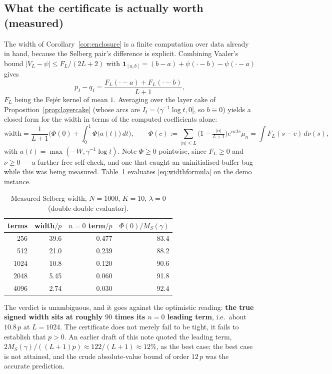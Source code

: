 \documentclass[11pt]{article}
\begin{document}
\subsection{What the certificate is actually worth (measured)}
\label{sec:worth}

The width of Corollary~\ref{cor:enclosure} is a finite computation over data already in hand,
because the Selberg pair's difference is explicit. Combining Vaaler's bound
$|V_L-\psi|\le F_L/(2L+2)$ with $\mathbf 1_{[a,b]}=(b-a)+\psi(\cdot-b)-\psi(\cdot-a)$ gives
\[
  p_I-q_I=\frac{F_L(\cdot-a)+F_L(\cdot-b)}{L+1},
\]
$F_L$ being the Fej\'er kernel of mean $1$. Averaging over the layer cake of
Proposition~\ref{prop:layercake} (whose arcs are $I_t=(\gamma^{-1}\log t,0]$, so $b\equiv0$) yields
a closed form for the width in terms of the computed coefficients alone:
\begin{equation}
  \label{eq:widthformula}
  \mathrm{width}=\frac{1}{L+1}\Big(\Phi(0)+\int_0^1\!\Phi\big(a(t)\big)\,dt\Big),
  \qquad
  \Phi(c):=\!\!\sum_{|n|\le L}\!\!\Big(1-\tfrac{|n|}{L+1}\Big)e^{inTc}\mu_n
  =\int F_L(s-c)\,d\nu(s),
\end{equation}
with $a(t)=\max(-W,\gamma^{-1}\log t)$. Note $\Phi\ge0$ pointwise, since $F_L\ge0$ and $\nu\ge0$ ---
a further free self-check, and one that caught an uninitialised-buffer bug while this was being
measured. Table~\ref{tab:width} evaluates \eqref{eq:widthformula} on the demo instance.

\begin{table}[h]
\centering
\caption{Measured Selberg width, $N=1000$, $K=10$, $\lambda=0$ (double-double evaluator).}
\label{tab:width}
\begin{tabular}{@{}rrrr@{}}
\toprule
terms & width$/p$ & $n{=}0$ term$/p$ & $\Phi(0)/M_S(\gamma)$ \\
\midrule
256  & 39.6 & 0.477 & 83.4 \\
512  & 21.0 & 0.239 & 88.2 \\
1024 & 10.8 & 0.120 & 90.6 \\
2048 & 5.45 & 0.060 & 91.8 \\
4096 & 2.74 & 0.030 & 92.4 \\
\bottomrule
\end{tabular}
\end{table}

The verdict is unambiguous, and it goes against the optimistic reading: \textbf{the true signed
width sits at roughly $90$ times its $n=0$ leading term}, i.e.\ about $10.8\,p$ at $L=1024$. The
certificate does not merely fail to be tight, it fails to establish that $p>0$. An earlier draft of
this note quoted the leading term, $2M_S(\gamma)/((L+1)p)\approx122/(L+1)\approx12\%$, as the best
case; the best case is not attained, and the crude absolute-value bound of order $12\,p$ was the
accurate prediction.
\end{document}
